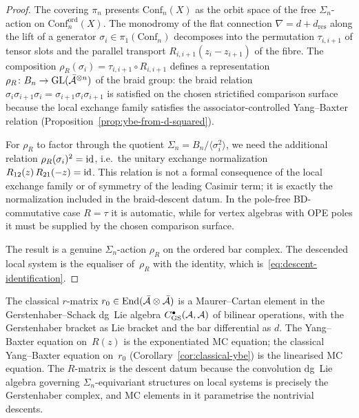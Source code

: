 \begin{proof}
The covering $\pi_n$ presents $\mathrm{Conf}_n(X)$ as the
orbit space of the free $\Sigma_n$-action on
$\mathrm{Conf}_n^{\mathrm{ord}}(X)$. The monodromy of the
flat connection $\nabla=d+d_{\mathrm{res}}$ along the lift of a
generator $\sigma_i\in\pi_1(\mathrm{Conf}_n)$ decomposes into
the permutation $\tau_{i,i+1}$ of tensor slots and the
parallel transport $R_{i,i+1}(z_i-z_{i+1})$ of the fibre.
The composition
$\rho_R(\sigma_i)=\tau_{i,i+1}\circ R_{i,i+1}$ defines a
representation $\rho_R\colon B_n\to\operatorname{GL}(\bar{\mathcal{A}}^{\otimes n})$
of the braid group: the braid relation
$\sigma_i\sigma_{i+1}\sigma_i
=\sigma_{i+1}\sigma_i\sigma_{i+1}$ is satisfied on the chosen
strictified comparison surface because the local exchange family
satisfies the associator-controlled Yang--Baxter relation
(Proposition~\ref{prop:ybe-from-d-squared}).

For $\rho_R$ to factor through the quotient
$\Sigma_n=B_n/\langle\sigma_i^2\rangle$, we need the
additional relation $\rho_R(\sigma_i)^2=\mathrm{id}$, i.e.\
the unitary exchange normalization \(R_{12}(z)\,R_{21}(-z)=\mathrm{id}\).
This relation is not a formal consequence of the local exchange family
or of symmetry of the leading Casimir term; it is exactly the
normalization included in the braid-descent datum.  In the pole-free
BD-commutative case \(R=\tau\) it is automatic, while for vertex
algebras with OPE poles it must be supplied by the chosen comparison
surface.

The result is a genuine $\Sigma_n$-action $\rho_R$ on the
ordered bar complex. The descended local system is the
equaliser of~$\rho_R$ with the identity,
which is~\eqref{eq:descent-identification}.
\end{proof}

\begin{remark}
\label{rem:r-matrix-mc}
The classical $r$-matrix
$r_0\in\operatorname{End}(\bar{\mathcal{A}}\otimes\bar{\mathcal{A}})$ is a
Maurer--Cartan element in the Gerstenhaber--Schack dg~Lie
algebra $C^\bullet_{\mathrm{GS}}(\mathcal{A},\mathcal{A})$ of bilinear
operations, with the Gerstenhaber bracket as Lie bracket
and the bar differential as $d$. The Yang--Baxter equation
on~$R(z)$ is the exponentiated MC equation; the
classical Yang--Baxter equation on~$r_0$
(Corollary~\ref{cor:classical-ybe}) is the linearised MC
equation. The $R$-matrix is the descent datum because the
convolution dg~Lie algebra governing $\Sigma_n$-equivariant
structures on local systems is precisely the Gerstenhaber
complex, and MC elements in it parametrise the nontrivial
descents.
\end{remark}

